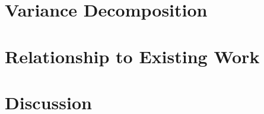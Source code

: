 \documentclass[11pt]{article}
\begin{document}
\section{Variance Decomposition}
\label{sec:variance}

%
%
%
%
%


\section{Relationship to Existing Work}
\label{sec:existing}

%
%
%


\section{Discussion}
\label{sec:discussion}

%
\end{document}
